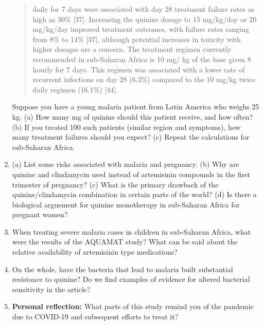 \documentclass[12pt]{article}
\begin{document}
\begin{enumerate}
\begin{quotation}
daily for 7 days were associated with day 28 treatment
failure rates as high as 30\% [37]. Increasing the quinine
dosage to 15 mg/kg/day or 20 mg/kg/day improved
treatment outcomes, with failure rates ranging from 8\%
to 14\% [37], although potential increases in toxicity with
higher dosages are a concern.  The treatment regimen
currently recommended in sub-Saharan Africa is 10 mg/
kg of the base given 8 hourly for 7 days. This regimen
was associated with a lower rate of recurrent infections
on day 28 (6.3\%) compared to the 10 mg/kg twice daily
regimen (16.1\%) [44].
\end{quotation}
Suppose you have a young malaria patient from Latin America who weighs 25 kg.  (a) How many mg of quinine should this patient receive, and how often? (b) If you treated 100 such patients (similar region and symptoms), how many treatment failures should you expect?  (c) Repeat the calculations for sub-Saharan Africa. \\ \vspace{2cm}
\item (a) List some risks associated with malaria and pregnancy. (b) Why are quinine and clindamycin used instead of artemisinin compounds in the first trimester of pregnancy? (c) What is the primary drawback of the quinine/clindamycin combination in certain parts of the world? (d) Is there a biological arguement for quinine monotherapy in sub-Saharan Africa for pregnant women? \\ \vspace{2cm}
\item When treating severe malaria cases in children in sub-Saharan Africa, what were the results of the AQUAMAT study? What can be said about the relative availability of artemisinin type medications? \\ \vspace{1.5cm}
\item On the whole, have the bacteria that lead to malaria built substantial resistance to quinine?  Do we find examples of evidence for altered bacterial sensitivity in the article? \\ \vspace{1.5cm}
\item \textbf{Personal reflection:} What parts of this study remind you of the pandemic due to COVID-19 and subsequent efforts to treat it?
\end{enumerate}
\end{document}
